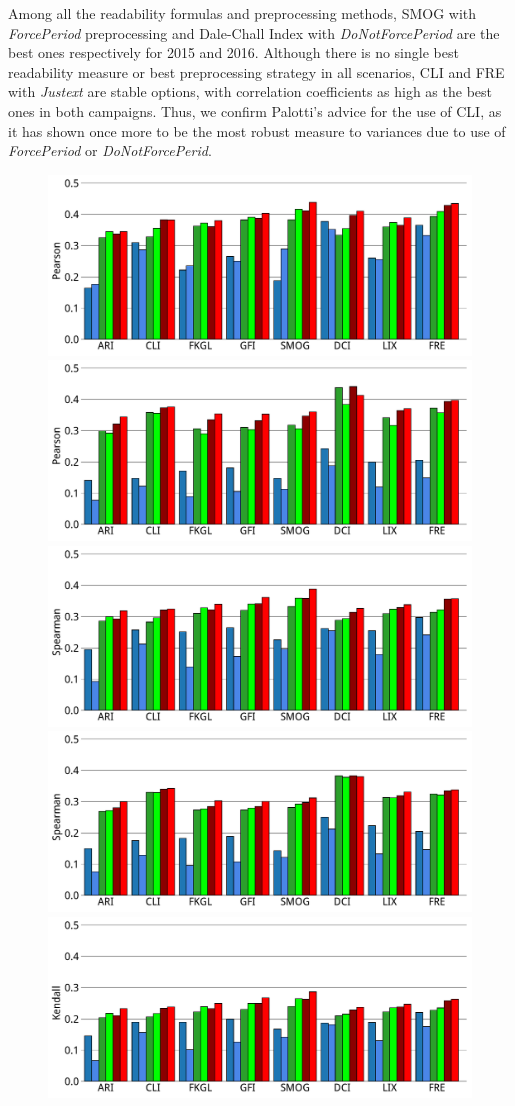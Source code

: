 Among all the readability formulas and preprocessing methods, SMOG with \textit{ForcePeriod} preprocessing and Dale-Chall Index with \textit{DoNotForcePeriod} are the best ones respectively for 2015 and 2016. Although there is no single best readability measure or best preprocessing strategy in all scenarios, CLI and FRE with \textit{Justext} are stable options, with correlation coefficients as high as the best ones in both campaigns. Thus, we confirm Palotti's advice for the use of CLI, as it
has shown once more to be the most robust measure to variances due to use of \textit{ForcePeriod} or \textit{DoNotForcePerid}.


\begin{figure}[th!]
   \centering
   \includegraphics[width=.45\textwidth]{graphics/bar_corr_pearson15_values}
   \includegraphics[width=.45\textwidth]{graphics/bar_corr_pearson16_values}
   \includegraphics[width=.45\textwidth]{graphics/bar_corr_spearman15_values}
   \includegraphics[width=.45\textwidth]{graphics/bar_corr_spearman16_values}
   \includegraphics[width=.45\textwidth]{graphics/bar_corr_kendalltau15_values}

\end{figure}

